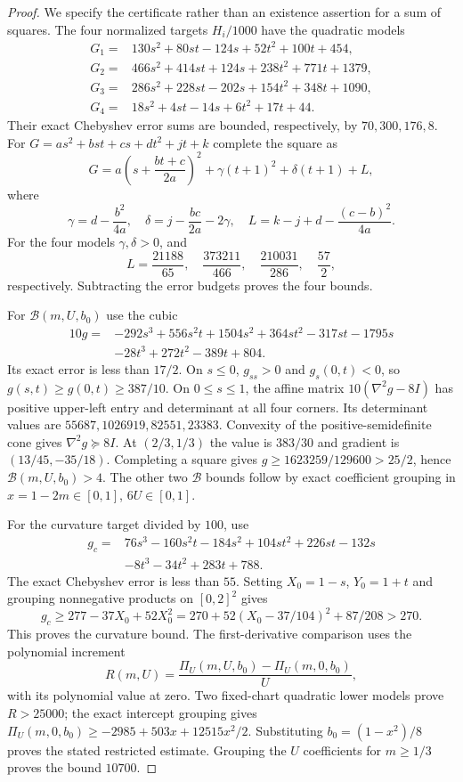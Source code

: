 \begin{proof}
We specify the certificate rather than an existence assertion for a sum
of squares.  The four normalized targets $H_i/1000$ have the quadratic
models
\[
 \begin{aligned}
 G_1={}&130s^2+80st-124s+52t^2+100t+454,\\
 G_2={}&466s^2+414st+124s+238t^2+771t+1379,\\
 G_3={}&286s^2+228st-202s+154t^2+348t+1090,\\
 G_4={}&18s^2+4st-14s+6t^2+17t+44.
 \end{aligned}
\]
Their exact Chebyshev error sums are bounded, respectively, by
$70,300,176,8$.  For $G=as^2+bst+cs+dt^2+jt+k$ complete the square as
\[
 G=a\left(s+\frac{bt+c}{2a}\right)^2
       +\gamma(t+1)^2+\delta(t+1)+L,
\]
where
\[
 \gamma=d-\frac{b^2}{4a},\quad
 \delta=j-\frac{bc}{2a}-2\gamma,\quad
 L=k-j+d-\frac{(c-b)^2}{4a}.
\]
For the four models $\gamma,\delta>0$, and
\[
 L=\frac{21188}{65},\quad\frac{373211}{466},\quad
   \frac{210031}{286},\quad\frac{57}{2},
\]
respectively.  Subtracting the error budgets proves the four bounds.

For $\mathcal B(m,U,b_0)$ use the cubic
\[
 \begin{split}
 10g={}&-292s^3+556s^2t+1504s^2+364st^2-317st-1795s\\
       &-28t^3+272t^2-389t+804.
 \end{split}
\]
Its exact error is less than $17/2$.  On $s\le0$, $g_{ss}>0$ and
$g_s(0,t)<0$, so $g(s,t)\ge g(0,t)\ge387/10$.
On $0\le s\le1$, the affine matrix $10(\nabla^2g-8I)$ has positive
upper-left entry and determinant at all four corners.  Its determinant
values are $55687,1026919,82551,23383$.  Convexity of the
positive-semidefinite cone gives $\nabla^2g\succeq8I$.
At $(2/3,1/3)$ the value is $383/30$ and gradient is
$(13/45,-35/18)$.  Completing a square gives
$g\ge1623259/129600>25/2$, hence $\mathcal B(m,U,b_0)>4$.
The other two $\mathcal B$ bounds follow by exact coefficient grouping
in $x=1-2m\in[0,1]$, $6U\in[0,1]$.

For the curvature target divided by $100$, use
\[
 \begin{split}
 g_c={}&76s^3-160s^2t-184s^2+104st^2+226st-132s\\
       &-8t^3-34t^2+283t+788.
 \end{split}
\]
The exact Chebyshev error is less than $55$.
Setting $X_0=1-s$, $Y_0=1+t$ and grouping nonnegative products on
$[0,2]^2$ gives
\[
 g_c\ge277-37X_0+52X_0^2
 =270+52(X_0-37/104)^2+87/208>270.
\]
This proves the curvature bound.  The first-derivative comparison uses
the polynomial increment
\[
 R(m,U)=\frac{\Pi_U(m,U,b_0)-\Pi_U(m,0,b_0)}{U},
\]
with its polynomial value at zero.  Two fixed-chart quadratic lower
models prove $R>25000$; the exact intercept grouping gives
$\Pi_U(m,0,b_0)\ge-2985+503x+12515x^2/2$.
Substituting $b_0=(1-x^2)/8$ proves the stated restricted estimate.
Grouping the $U$ coefficients for $m\ge1/3$ proves the bound $10700$.


\end{proof}
